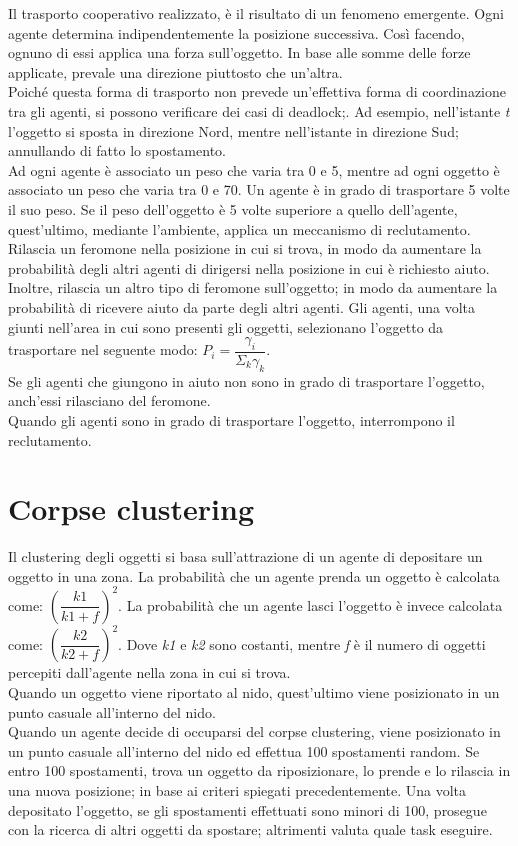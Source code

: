 \documentclass[12pt,a4paper,openright,twoside]{report}
\begin{document}
Il trasporto cooperativo realizzato, è il risultato di un fenomeno emergente. Ogni agente determina indipendentemente la posizione successiva. Così facendo, ognuno di essi applica una forza sull'oggetto. In base alle somme delle forze applicate, prevale una direzione piuttosto che un'altra.\\
Poiché questa forma di trasporto non prevede un'effettiva forma di coordinazione tra gli agenti, si possono verificare dei casi di deadlock;. Ad esempio, nell'istante \textit{t} l'oggetto si sposta in direzione Nord, mentre nell'istante  in direzione Sud; annullando di fatto lo spostamento.\\
Ad ogni agente è associato un peso che varia tra 0 e 5, mentre ad ogni oggetto è associato un peso che varia tra 0 e 70. Un agente è in grado di trasportare 5 volte il suo peso. Se il peso dell'oggetto è 5 volte superiore a quello dell'agente, quest'ultimo, mediante l'ambiente, applica un meccanismo di reclutamento. Rilascia un feromone nella posizione in cui si trova, in modo da aumentare la probabilità degli altri agenti di dirigersi nella posizione in cui è richiesto aiuto. Inoltre, rilascia un altro tipo di feromone sull'oggetto; in modo da aumentare la probabilità di ricevere aiuto da parte degli altri agenti. Gli agenti, una volta giunti nell'area in cui sono presenti gli oggetti, selezionano l'oggetto da trasportare nel seguente modo: $P_i =\dfrac{\gamma_i}{\Sigma_k \gamma_k}$.\\ Se gli agenti che giungono in aiuto non sono in grado di trasportare l'oggetto, anch'essi rilasciano del feromone.\\
Quando gli agenti sono in grado di trasportare l'oggetto, interrompono il reclutamento.

\section{Corpse clustering}

Il clustering degli oggetti si basa sull'attrazione di un agente di depositare un oggetto in una zona. La probabilità che un agente prenda un oggetto è calcolata come: $(\dfrac{k1}{k1+f})^2$. La probabilità che un agente lasci l'oggetto è invece calcolata come: $(\dfrac{k2}{k2+f})^2$. Dove \textit{k1} e \textit{k2} sono costanti, mentre \textit{f} è il numero di oggetti percepiti dall'agente nella zona in cui si trova.\\
Quando un oggetto viene riportato al nido, quest'ultimo viene posizionato in un punto casuale all'interno del nido.\\
Quando un agente decide di occuparsi del corpse clustering, viene posizionato in un punto casuale all'interno del nido ed effettua 100 spostamenti random. Se entro 100 spostamenti, trova un oggetto da riposizionare, lo prende e lo rilascia in una nuova posizione; in base ai criteri spiegati precedentemente. Una volta depositato l'oggetto, se gli spostamenti effettuati sono minori di 100, prosegue con la ricerca di altri oggetti da spostare; altrimenti valuta quale task eseguire.
\end{document}
